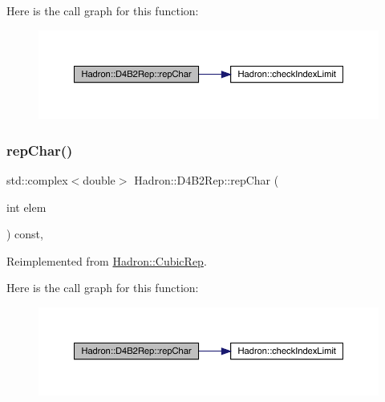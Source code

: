 Here is the call graph for this function\+:
\nopagebreak
\begin{figure}[H]
\begin{center}
\leavevmode
\includegraphics[width=350pt]{d0/d07/structHadron_1_1D4B2Rep_a23d3d1b8d91d37f5d2c70f3ea7950ab7_cgraph}
\end{center}
\end{figure}
\mbox{\label{structHadron_1_1D4B2Rep_a23d3d1b8d91d37f5d2c70f3ea7950ab7}} 
\subsubsection{\texorpdfstring{repChar()}{repChar()}\hspace{0.1cm}{\footnotesize\ttfamily [2/2]}}
{\footnotesize\ttfamily std\+::complex$<$double$>$ Hadron\+::\+D4\+B2\+Rep\+::rep\+Char (\begin{DoxyParamCaption}\item[{int}]{elem }\end{DoxyParamCaption}) const\hspace{0.3cm}{\ttfamily [inline]}, {\ttfamily [virtual]}}



Reimplemented from \mbox{\hyperlink{structHadron_1_1CubicRep_af45227106e8e715e84b0af69cd3b36f8}{Hadron\+::\+Cubic\+Rep}}.

Here is the call graph for this function\+:
\nopagebreak
\begin{figure}[H]
\begin{center}
\leavevmode
\includegraphics[width=350pt]{d0/d07/structHadron_1_1D4B2Rep_a23d3d1b8d91d37f5d2c70f3ea7950ab7_cgraph}
\end{center}
\end{figure}
\mbox{\label{structHadron_1_1D4B2Rep_a245244df26be686b405786bd1df4627e}} 
